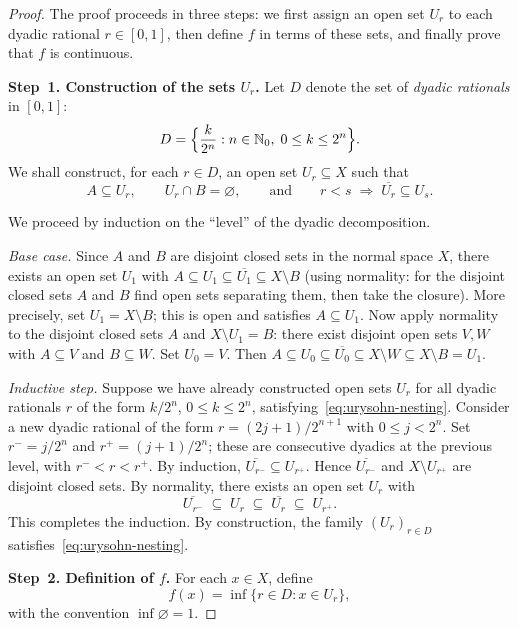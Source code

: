 \documentclass[11pt,a4paper,twoside]{book}
\theoremstyle{remark}
\theoremstyle{definition}
\theoremstyle{definition}
\begin{document}
\begin{proof}
The proof proceeds in three steps: we first assign an open set $U_r$
to each dyadic rational $r\in[0,1]$, then define $f$ in terms of these
sets, and finally prove that $f$ is continuous.

\medskip
\textbf{Step~1.  Construction of the sets $U_r$.}
Let $D$ denote the set of \emph{dyadic rationals} in $[0,1]$:
\[
  D = \Bigl\{\frac{k}{2^n} : n\in\mathbb{N}_0,\;
        0\le k\le 2^n\Bigr\}.
\]
We shall construct, for each $r\in D$, an open set $U_r\subseteq X$
such that
\begin{equation}
  \label{eq:urysohn-nesting}
  A\subseteq U_r,\qquad U_r\cap B=\varnothing,
  \qquad\text{and}\qquad
  r<s \;\Longrightarrow\; \overline{U_r}\subseteq U_s.
\end{equation}

We proceed by induction on the ``level'' of the dyadic decomposition.

\emph{Base case.}  Since $A$ and $B$ are disjoint closed sets in the
normal space $X$, there exists an open set $U_1$ with
$A\subseteq U_1\subseteq\overline{U_1}\subseteq X\setminus B$
(using normality: for the disjoint closed sets $A$ and $B$ find open
sets separating them, then take the closure).  More precisely, set
$U_1 = X\setminus B$; this is open and satisfies
$A\subseteq U_1$.  Now apply normality to the disjoint closed sets $A$
and $X\setminus U_1 = B$: there exist disjoint open sets $V,W$ with
$A\subseteq V$ and $B\subseteq W$.  Set $U_0 = V$.  Then
$A\subseteq U_0\subseteq\overline{U_0}\subseteq X\setminus W
\subseteq X\setminus B = U_1$.

\emph{Inductive step.}  Suppose we have already constructed open sets
$U_r$ for all dyadic rationals $r$ of the form $k/2^n$,
$0\le k\le 2^n$, satisfying~\eqref{eq:urysohn-nesting}.  Consider a
new dyadic rational of the form $r = (2j+1)/2^{n+1}$ with
$0\le j< 2^n$.  Set $r^{-} = j/2^n$ and $r^{+} = (j+1)/2^n$; these
are consecutive dyadics at the previous level, with $r^{-}<r<r^{+}$.
By induction, $\overline{U_{r^-}}\subseteq U_{r^+}$.  Hence
$\overline{U_{r^-}}$ and $X\setminus U_{r^+}$ are disjoint closed
sets.  By normality, there exists an open set $U_r$ with
\[
  \overline{U_{r^-}} \;\subseteq\; U_r
  \;\subseteq\; \overline{U_r}
  \;\subseteq\; U_{r^+}.
\]
This completes the induction.  By construction, the family
$(U_r)_{r\in D}$ satisfies~\eqref{eq:urysohn-nesting}.

\medskip
\textbf{Step~2.  Definition of $f$.}
For each $x\in X$, define
\[
  f(x) = \inf\bigl\{r\in D : x\in U_r\bigr\},
\]
with the convention $\inf\varnothing = 1$.


\end{proof}
\end{document}
